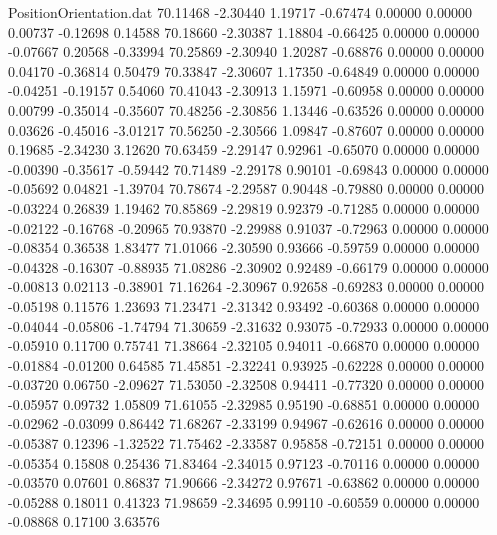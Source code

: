 \begin{filecontents}{PositionOrientation.dat}
  70.11468   -2.30440    1.19717    -0.67474    0.00000    0.00000    0.00737   -0.12698    0.14588
  70.18660   -2.30387    1.18804    -0.66425    0.00000    0.00000   -0.07667    0.20568   -0.33994
  70.25869   -2.30940    1.20287    -0.68876    0.00000    0.00000    0.04170   -0.36814    0.50479
  70.33847   -2.30607    1.17350    -0.64849    0.00000    0.00000   -0.04251   -0.19157    0.54060
  70.41043   -2.30913    1.15971    -0.60958    0.00000    0.00000    0.00799   -0.35014   -0.35607
  70.48256   -2.30856    1.13446    -0.63526    0.00000    0.00000    0.03626   -0.45016   -3.01217
  70.56250   -2.30566    1.09847    -0.87607    0.00000    0.00000    0.19685   -2.34230    3.12620
  70.63459   -2.29147    0.92961    -0.65070    0.00000    0.00000   -0.00390   -0.35617   -0.59442
  70.71489   -2.29178    0.90101    -0.69843    0.00000    0.00000   -0.05692    0.04821   -1.39704
  70.78674   -2.29587    0.90448    -0.79880    0.00000    0.00000   -0.03224    0.26839    1.19462
  70.85869   -2.29819    0.92379    -0.71285    0.00000    0.00000   -0.02122   -0.16768   -0.20965
  70.93870   -2.29988    0.91037    -0.72963    0.00000    0.00000   -0.08354    0.36538    1.83477
  71.01066   -2.30590    0.93666    -0.59759    0.00000    0.00000   -0.04328   -0.16307   -0.88935
  71.08286   -2.30902    0.92489    -0.66179    0.00000    0.00000   -0.00813    0.02113   -0.38901
  71.16264   -2.30967    0.92658    -0.69283    0.00000    0.00000   -0.05198    0.11576    1.23693
  71.23471   -2.31342    0.93492    -0.60368    0.00000    0.00000   -0.04044   -0.05806   -1.74794
  71.30659   -2.31632    0.93075    -0.72933    0.00000    0.00000   -0.05910    0.11700    0.75741
  71.38664   -2.32105    0.94011    -0.66870    0.00000    0.00000   -0.01884   -0.01200    0.64585
  71.45851   -2.32241    0.93925    -0.62228    0.00000    0.00000   -0.03720    0.06750   -2.09627
  71.53050   -2.32508    0.94411    -0.77320    0.00000    0.00000   -0.05957    0.09732    1.05809
  71.61055   -2.32985    0.95190    -0.68851    0.00000    0.00000   -0.02962   -0.03099    0.86442
  71.68267   -2.33199    0.94967    -0.62616    0.00000    0.00000   -0.05387    0.12396   -1.32522
  71.75462   -2.33587    0.95858    -0.72151    0.00000    0.00000   -0.05354    0.15808    0.25436
  71.83464   -2.34015    0.97123    -0.70116    0.00000    0.00000   -0.03570    0.07601    0.86837
  71.90666   -2.34272    0.97671    -0.63862    0.00000    0.00000   -0.05288    0.18011    0.41323
  71.98659   -2.34695    0.99110    -0.60559    0.00000    0.00000   -0.08868    0.17100    3.63576

\end{filecontents}
